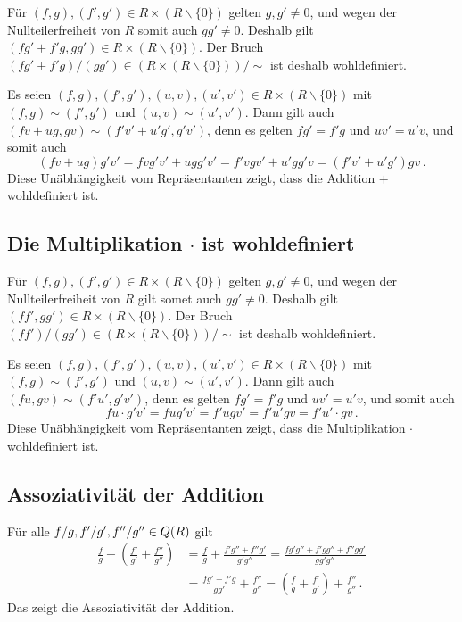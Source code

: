 Für $(f,g), (f', g') \in R \times (R \smallsetminus\{0\})$ gelten $g, g' \neq 0$, und wegen der Nullteilerfreiheit von $R$ somit auch $g g' \neq 0$.
Deshalb gilt $(f g' + f' g, g g') \in R \times (R \smallsetminus\{0\})$.
Der Bruch $(f g' + f' g)/(g g') \in (R \times (R \smallsetminus\{0\}))/{\sim}$ ist deshalb wohldefiniert.

Es seien $(f,g), (f', g'), (u, v), (u', v') \in R \times (R \smallsetminus\{0\})$ mit $(f, g) \sim (f', g')$ und $(u,v) \sim (u',v')$.
Dann gilt auch $(f v + u g, g v) \sim (f' v' + u' g', g' v')$, denn es gelten $f g' = f' g$ und $u v' = u' v$, und somit auch
\[
    (f v + u g) g' v'
  = f v g' v' + u g g' v'
  = f' v g v' + u' g g' v
  = (f' v' + u' g') g v \,.
\]
Diese Unäbhängigkeit vom Repräsentanten zeigt, dass die Addition $+$ wohldefiniert ist.





\subsection*{Die Multiplikation $\cdot$ ist wohldefiniert}

Für $(f,g), (f', g') \in R \times (R \smallsetminus\{0\})$ gelten $g, g' \neq 0$, und wegen der Nullteilerfreiheit von $R$ gilt somet auch $g g ' \neq 0$.
Deshalb gilt $(f f', g g') \in R \times (R \smallsetminus\{0\})$.
Der Bruch $(ff')/(gg') \in (R \times (R \smallsetminus\{0\}))/{\sim}$ ist deshalb wohldefiniert.

Es seien $(f,g), (f', g'), (u, v), (u', v') \in R \times (R \smallsetminus\{0\})$ mit $(f, g) \sim (f', g')$ und $(u,v) \sim (u',v')$.
Dann gilt auch $(f u, g v ) \sim (f' u', g' v')$, denn es gelten $f g' = f' g$ und $u v' = u' v$, und somit auch
\[
      f u \cdot g' v'
    = f u g' v'
    = f' u g v'
    = f' u' g v
    = f' u' \cdot g v \,.
\]
Diese Unäbhängigkeit vom Repräsentanten zeigt, dass die Multiplikation $\cdot$ wohldefiniert ist.





\subsection*{Assoziativität der Addition}

Für alle $f/g, f'/g', f''/g'' \in Q(R)$ gilt
\begin{align*}
      \frac{f}{g} + \left( \frac{f'}{g'} + \frac{f''}{g''} \right)
  &=  \frac{f}{g} + \frac{f' g'' + f'' g'}{g' g''}
   =  \frac{f g' g'' + f' g g'' + f'' g g'}{g g' g''} \\
  &=  \frac{f g' + f' g}{g g'} + \frac{f''}{g''}
   =  \left( \frac{f}{g} + \frac{f'}{g'} \right) + \frac{f''}{g''} \,.
\end{align*}
Das zeigt die Assoziativität der Addition.





